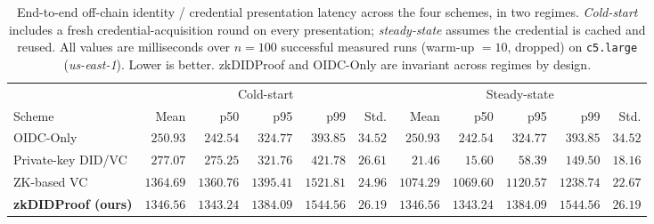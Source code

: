 \begin{table}[t]
  \centering
  \small
  \setlength{\tabcolsep}{4pt}
  \caption{End-to-end off-chain identity / credential presentation latency
    across the four schemes, in two regimes. \emph{Cold-start} includes a
    fresh credential-acquisition round on every presentation; \emph{steady-state}
    assumes the credential is cached and reused. All values are milliseconds
    over $n=100$ successful measured runs (warm-up $=10$, dropped) on
    \texttt{c5.large} (\textit{us-east-1}). Lower is better.
    \textsf{zkDIDProof} and \textsf{OIDC-Only} are invariant across regimes
    by design.}
  \label{tab:presentation-latency-stats}
  \begin{tabular}{lrrrrr|rrrrr}
    \toprule
    & \multicolumn{5}{c|}{Cold-start} & \multicolumn{5}{c}{Steady-state} \\
    Scheme & Mean & p50 & p95 & p99 & Std. & Mean & p50 & p95 & p99 & Std. \\
    \midrule
    OIDC-Only             & $250.93$  & $242.54$  & $324.77$  & $393.85$  & $34.52$  & $250.93$  & $242.54$  & $324.77$  & $393.85$  & $34.52$ \\
    Private-key DID/VC    & $277.07$  & $275.25$  & $321.76$  & $421.78$  & $26.61$  & $\phantom{0}21.46$   & $\phantom{0}15.60$   & $\phantom{0}58.39$   & $149.50$  & $18.16$ \\
    ZK-based VC           & $1364.69$ & $1360.76$ & $1395.41$ & $1521.81$ & $24.96$  & $1074.29$ & $1069.60$ & $1120.57$ & $1238.74$ & $22.67$ \\
    \textbf{zkDIDProof (ours)} & $\mathbf{1346.56}$ & $\mathbf{1343.24}$ & $\mathbf{1384.09}$ & $\mathbf{1544.56}$ & $\mathbf{26.19}$ & $\mathbf{1346.56}$ & $\mathbf{1343.24}$ & $\mathbf{1384.09}$ & $\mathbf{1544.56}$ & $\mathbf{26.19}$ \\
    \bottomrule
  \end{tabular}
\end{table}

